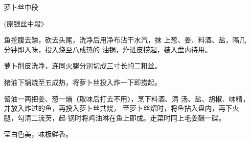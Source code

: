 \begin{recipe}{萝卜丝中段}

(原银丝中段〉

\ingredients




\cooking

\step 	鱼挖腹去鱗，砍去头尾，洗净后用净布沾干水汽，抹 上葱、姜、料酒、盐，隔几分钟即入味，投入烧至八成热的 油锅，炸进皮捞起，装入盘内待用。

\step 	萝卜削皮洗净，连同火腿分别切成三寸长的二粗丝。

\step 猪油下锅烧至五成热，将萝卜丝投入炸一下即捞起。

留油一两把姜、葱一熵（取味后打去不用〉，烹下料酒、清 汤、盐、胡椒、味精，并放入炸过的鱼，再投入萝卜丝共烧， 至萝卜丝炤时，将鱼拈入盘内，再下火腿，勾清二流芡，起-锅时将鸡油淋在鱼上即成。走菜时同上毛姜醋一碟。

\notes

莹白色美，味极鲜香。

\end{recipe}

